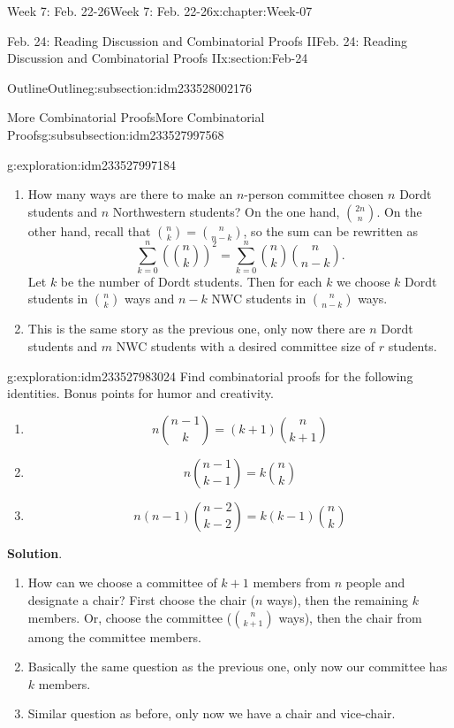 \documentclass[oneside,10pt,]{book}
\newcommand{\blocktitlefont}{\relax}
\numberwithin{equation}{section}
\begin{document}
\begin{chapterptx}{Week 7: Feb. 22-26}{}{Week 7: Feb. 22-26}{}{}{x:chapter:Week-07}
\begin{sectionptx}{Feb. 24: Reading Discussion and Combinatorial Proofs II}{}{Feb. 24: Reading Discussion and Combinatorial Proofs II}{}{}{x:section:Feb-24}
\begin{subsectionptx}{Outline}{}{Outline}{}{}{g:subsection:idm233528002176}
\begin{subsubsectionptx}{More Combinatorial Proofs}{}{More Combinatorial Proofs}{}{}{g:subsubsection:idm233527997568}
\begin{exploration}{}{g:exploration:idm233527997184}
\begin{enumerate}
\item{}How many ways are there to make an \(n\)-person committee chosen \(n\) Dordt students and \(n\) Northwestern students? On the one hand, \(\binom{2n}{n}\). On the other hand, recall that \(\binom{n}{k} = \binom{n}{n-k}\), so the sum can be rewritten as%
\begin{equation*}
\sum\limits_{k=0}^n \left(\binom{n}{k}\right)^2 = \sum\limits_{k=0}^n \binom{n}{k} \binom{n}{n-k}.
\end{equation*}
Let \(k\) be the number of Dordt students. Then for each \(k\) we choose \(k\) Dordt students in \(\binom{n}{k}\) ways and \(n-k\) NWC students in \(\binom{n}{n-k}\) ways.%
\item{}This is the same story as the previous one, only now there are \(n\) Dordt students and \(m\) NWC students with a desired committee size of \(r\) students.%
\end{enumerate}
\end{exploration}%
\begin{exploration}{}{g:exploration:idm233527983024}%
Find combinatorial proofs for the following identities. Bonus points for humor and creativity.%
%
\begin{enumerate}
\item{}%
\begin{equation*}
n\binom{n-1}{k} = (k+1) \binom{n}{k+1}
\end{equation*}
%
\item{}%
\begin{equation*}
n\binom{n-1}{k-1} = k\binom{n}{k}
\end{equation*}
%
\item{}%
\begin{equation*}
n(n-1)\binom{n-2}{k-2} = k(k-1)\binom{n}{k}
\end{equation*}
%
\end{enumerate}
\par\smallskip%
\noindent\textbf{\blocktitlefont Solution}.\hypertarget{g:solution:idm233527979744}{}\quad{}%
\begin{enumerate}
\item{}How can we choose a committee of \(k+1\) members from \(n\) people and designate a chair? First choose the chair (\(n\) ways), then the remaining \(k\) members. Or, choose the committee (\(\binom{n}{k+1}\) ways), then the chair from among the committee members.%
\item{}Basically the same question as the previous one, only now our committee has \(k\) members.%
\item{}Similar question as before, only now we have a chair and vice-chair.%

\end{enumerate}
\end{exploration}
\end{subsubsectionptx}
\end{subsectionptx}
\end{sectionptx}
\end{chapterptx}
\end{document}
